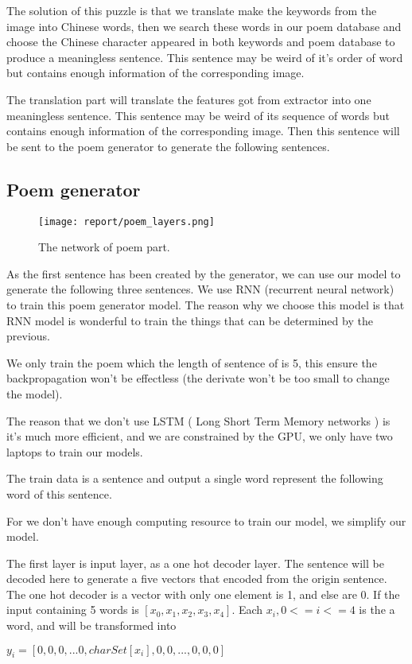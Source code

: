 \documentclass[10pt,twocolumn,letterpaper]{article}
\begin{document}
The solution of this puzzle is that we translate make the keywords from the image into Chinese words, then we search these words in our poem database and choose the Chinese character appeared in both keywords and poem database to produce a meaningless sentence. This sentence may be weird of it's order of word but contains enough information of the corresponding image.

The translation part will translate the features got from extractor into one meaningless sentence. This sentence may be weird of its sequence of words but contains enough information of the corresponding image. Then this sentence will be sent to the poem generator to generate the following sentences.

\subsection{Poem generator}

\begin{figure*}[t]
\begin{center}
   \texttt{[image: report/poem\_layers.png]}
\end{center}
   \caption{The network of poem part.}
\label{fig:poem_layer_network}
\end{figure*}

As the first sentence has been created by the generator, we can use our model to generate the following three sentences.
We use RNN (recurrent neural network) to train this poem generator model. The reason why we choose this model is that RNN model is wonderful to train the things that can be determined by the previous. 

We only train the poem which the length of sentence of is 5, this ensure the backpropagation won’t be effectless (the derivate won’t be too small to change the model). 

The reason that we don’t use LSTM ( Long Short Term Memory networks ) is it’s much more efficient, and we are constrained by the GPU, we only have two laptops to train our models. 

The train data is a sentence and output a single word represent the following word of this sentence.

For we don’t have enough computing resource to train our model, we simplify our model.

The first layer is input layer, as a one hot decoder layer. The sentence will be decoded here to generate a five vectors that encoded from the origin sentence. The one hot decoder is a vector with only one element is 1, and else are 0. If the input containing 5 words is $[x_{0}, x_{1}, x_{2}, x_{3}, x_{4}]$. Each $x_{i}, 0 <= i <= 4$ is the a word, and will be transformed into 
\begin{center}
$y_{i} = [0, 0, 0, ... 0, charSet[x_{i}], 0, 0, ... , 0, 0, 0]$
\end{center}
\end{document}
